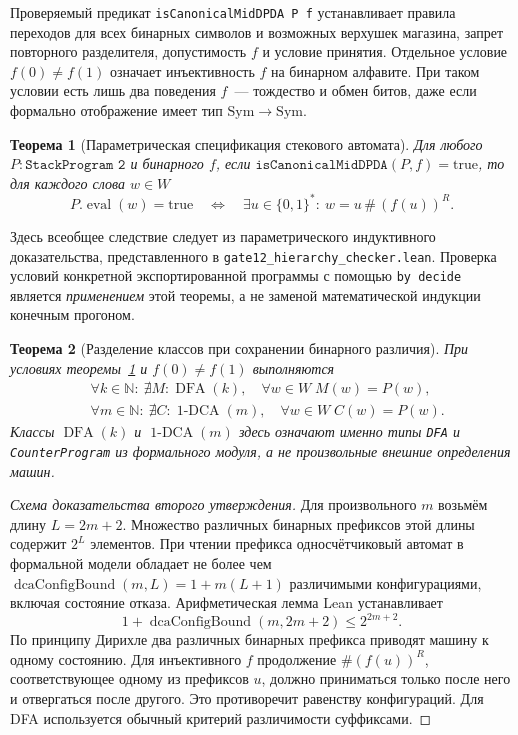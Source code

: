 \documentclass[11pt,a4paper]{article}
\newtheorem{theorem}{Теорема}[section]
\newcommand{\DFA}{\operatorname{DFA}}
\newcommand{\oneDCA}{\operatorname{1\text{-}DCA}}
\begin{document}
Проверяемый предикат \texttt{isCanonicalMidDPDA P f} устанавливает правила переходов для всех бинарных символов и возможных верхушек магазина, запрет повторного разделителя, допустимость $f$ и условие принятия. Отдельное условие $f(0)\ne f(1)$ означает инъективность $f$ на бинарном алфавите. При таком условии есть лишь два поведения $f$~--- тождество и обмен битов, даже если формально отображение имеет тип $\mathrm{Sym}\to\mathrm{Sym}$.

\begin{theorem}[Параметрическая спецификация стекового автомата]\label{thm:dpda}
Для любого $P:\texttt{StackProgram 2}$ и бинарного $f$, если $\texttt{isCanonicalMidDPDA}(P,f)=\mathrm{true}$, то для каждого слова $w\in W$
\begin{equation}\label{eq:dpda-sound}
P.\operatorname{eval}(w)=\mathrm{true}
\quad\Longleftrightarrow\quad
\exists u\in\{0,1\}^*:\ w=u\,\#\,(f(u))^R.
\end{equation}
\end{theorem}
Здесь всеобщее следствие следует из параметрического индуктивного доказательства, представленного в \texttt{gate12\_hierarchy\_checker.lean}. Проверка условий конкретной экспортированной программы с помощью \texttt{by decide} является \emph{применением} этой теоремы, а не заменой математической индукции конечным прогоном.

\begin{theorem}[Разделение классов при сохранении бинарного различия]\label{thm:separation}
При условиях теоремы~\ref{thm:dpda} и $f(0)\ne f(1)$ выполняются
\begin{equation}\label{eq:global-sep}
\begin{aligned}
&\forall k\in\mathbb N:\ \nexists M:\DFA(k),\quad
  \forall w\in W\; M(w)=P(w),\\
&\forall m\in\mathbb N:\ \nexists C:\oneDCA(m),\quad
  \forall w\in W\; C(w)=P(w).
\end{aligned}
\end{equation}
Классы $\DFA(k)$ и $\oneDCA(m)$ здесь означают именно типы \texttt{DFA} и \texttt{CounterProgram} из формального модуля, а не произвольные внешние определения машин.
\end{theorem}

\begin{proof}[Схема доказательства второго утверждения]
Для произвольного $m$ возьмём длину $L=2m+2$. Множество различных бинарных префиксов этой длины содержит $2^L$ элементов. При чтении префикса односчётчиковый автомат в формальной модели обладает не более чем $\operatorname{dcaConfigBound}(m,L)=1+m(L+1)$ различимыми конфигурациями, включая состояние отказа. Арифметическая лемма Lean устанавливает
\begin{equation}\label{eq:dca-bound}
1+\operatorname{dcaConfigBound}(m,2m+2)\le 2^{2m+2}.
\end{equation}
По принципу Дирихле два различных бинарных префикса приводят машину к одному состоянию. Для инъективного $f$ продолжение $\#(f(u))^R$, соответствующее одному из префиксов $u$, должно приниматься только после него и отвергаться после другого. Это противоречит равенству конфигураций. Для DFA используется обычный критерий различимости суффиксами.
\end{proof}
\end{document}

